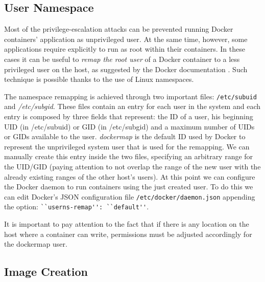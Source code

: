 \documentclass[a4paper,12pt]{article}
\newcommand{\file}[1]{\texttt{#1}\xspace}
\newcommand{\code}[1]{\lstinline|#1|}
\begin{document}
\subsection{User Namespace}

Most of the privilege-escalation attacks can be prevented running Docker
containers' application as unprivileged user. At the same time, however, some
applications require explicitly to run as root within their containers. In these
cases it can be useful to \textit{remap the root user} of a Docker container to
a less privileged user on the host, as suggested by the Docker documentation
\cite{isolate_namespace}. Such technique is possible thanks to the use of Linux
namespaces. \par The namespace remapping is achieved through two important
files: \file{/etc/subuid} and \textit{/etc/subgid}. These files contain an entry
for each user in the system and each entry is composed by three fields that
represent: the ID of a user, his beginning UID (in /etc/subuid) or GID (in
/etc/subgid) and a maximum number of UIDs or GIDs available to the user.
\textit{dockermap} is the default ID used by Docker to represent the
unprivileged system user that is used for the remapping. We can manually create
this entry inside the two files, specifying an arbitrary range for the UID/GID
(paying attention to not overlap the range of the new user with the already
existing ranges of the other host's users). At this point we can configure the
Docker daemon to run containers using the just created user. To do this we can
edit Docker's JSON configuration file \file{/etc/docker/daemon.json} appending
the option: \code{``userns-remap'': ``default''}. \par It is important to pay
attention to the fact that if there is any location on the host where a
container can write, permissions must be adjusted accordingly for the dockermap
user. 

\subsection{Image Creation}
\end{document}
